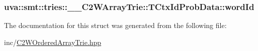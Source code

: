\subsubsection[{word\+Id}]{ uva\+::smt\+::tries\+::\+\_\+\+\_\+\+C2\+W\+Array\+Trie\+::\+T\+Ctx\+Id\+Prob\+Data\+::word\+Id}\label{structuva_1_1smt_1_1tries_1_1_____c2_w_array_trie_1_1_t_ctx_id_prob_data_ad69e7e7b248030495a5eaa3bbf9d570c}


The documentation for this struct was generated from the following file\+:\begin{DoxyCompactItemize}
\item 
inc/\hyperlink{_c2_w_ordered_array_trie_8hpp}{C2\+W\+Ordered\+Array\+Trie.\+hpp}\end{DoxyCompactItemize}

